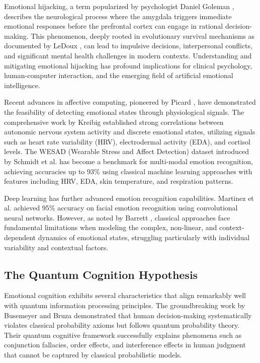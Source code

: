 \documentclass[11pt,letterpaper]{article}
\begin{document}
Emotional hijacking, a term popularized by psychologist Daniel Goleman \cite{goleman1995emotional}, describes the neurological process where the amygdala triggers immediate emotional responses before the prefrontal cortex can engage in rational decision-making. This phenomenon, deeply rooted in evolutionary survival mechanisms as documented by LeDoux \cite{ledoux1996emotional}, can lead to impulsive decisions, interpersonal conflicts, and significant mental health challenges in modern contexts. Understanding and mitigating emotional hijacking has profound implications for clinical psychology, human-computer interaction, and the emerging field of artificial emotional intelligence.

Recent advances in affective computing, pioneered by Picard \cite{picard2000affective}, have demonstrated the feasibility of detecting emotional states through physiological signals. The comprehensive work by Kreibig \cite{kreibig2010autonomic} established strong correlations between autonomic nervous system activity and discrete emotional states, utilizing signals such as heart rate variability (HRV), electrodermal activity (EDA), and cortisol levels. The WESAD (Wearable Stress and Affect Detection) dataset introduced by Schmidt et al. \cite{schmidt2018introducing} has become a benchmark for multi-modal emotion recognition, achieving accuracies up to 93\% using classical machine learning approaches with features including HRV, EDA, skin temperature, and respiration patterns.

Deep learning has further advanced emotion recognition capabilities. Martinez et al. \cite{martinez2019facial} achieved 95\% accuracy on facial emotion recognition using convolutional neural networks. However, as noted by Barrett \cite{barrett2017emotions}, classical approaches face fundamental limitations when modeling the complex, non-linear, and context-dependent dynamics of emotional states, struggling particularly with individual variability and contextual factors.

\subsection{The Quantum Cognition Hypothesis}

Emotional cognition exhibits several characteristics that align remarkably well with quantum information processing principles. The groundbreaking work by Busemeyer and Bruza \cite{busemeyer2012quantum} demonstrated that human decision-making systematically violates classical probability axioms but follows quantum probability theory. Their quantum cognitive framework successfully explains phenomena such as conjunction fallacies, order effects, and interference effects in human judgment that cannot be captured by classical probabilistic models.
\end{document}
